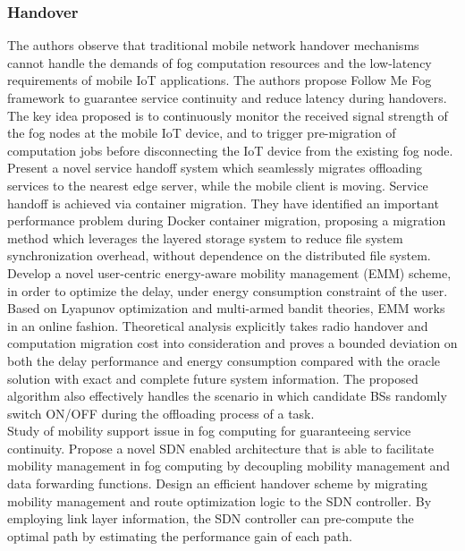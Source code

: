 \subsubsection{Handover}
\cite{bao2017follow}
The authors observe that traditional mobile network handover mechanisms cannot handle the demands of fog computation resources and the low-latency requirements of mobile IoT applications. The authors propose Follow Me Fog framework to guarantee service continuity and reduce latency during handovers. The key idea proposed is to continuously monitor the received signal strength of the fog nodes at the mobile IoT device, and to trigger pre-migration of computation jobs before disconnecting the IoT device from the existing fog node.\\
\cite{ma2017efficient}
Present a novel service handoff system which seamlessly migrates offloading services to the nearest edge server, while the mobile client is moving. Service handoff is achieved via container migration. They have identified an important performance problem during Docker container migration, proposing a migration method which leverages the layered storage system to reduce file system synchronization overhead, without dependence on the distributed file system.\\
\cite{sun2017emm}
Develop a novel user-centric energy-aware mobility management (EMM) scheme, in order to optimize the delay, under energy consumption constraint of the user. Based on Lyapunov optimization and multi-armed bandit theories, EMM works in an online fashion. Theoretical analysis explicitly takes radio handover and computation migration cost into consideration and proves a bounded deviation on both the delay performance and energy consumption compared with the oracle solution with exact and complete future system information. The proposed algorithm also effectively handles the scenario in which candidate BSs randomly switch ON/OFF during the offloading process of a task.\\
\cite{bi2018mobility}
Study of mobility support issue in fog computing for guaranteeing service continuity. Propose a novel SDN enabled architecture that is able to facilitate mobility management in fog computing by decoupling mobility management and data forwarding functions. Design an efficient handover scheme by migrating mobility management and route optimization logic to the SDN controller. By employing link layer information, the SDN controller can pre-compute the optimal path by estimating the performance gain of each path.\\
